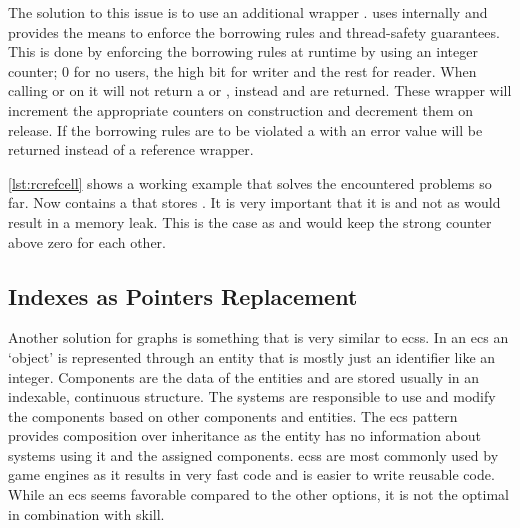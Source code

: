 \documentclass[thesis]{subfiles}
\begin{document}
    The solution to this issue is to use an additional wrapper .
     uses internally  and provides the means to enforce the borrowing rules and thread-safety guarantees.
    This is done by enforcing the borrowing rules at runtime by using an integer counter; 0 for no users, the high bit for writer and the rest for reader.
    When calling  or  on  it will not return a  or , instead  and  are returned.
    These wrapper will increment the appropriate counters on construction and decrement them on release.
    If the borrowing rules are to be violated a  with an error value will be returned instead of a reference wrapper.\autocite{rust-doc}

    

    \autoref{lst:rcrefcell} shows a working example that solves the encountered problems so far.
    Now \Node contains a  that stores \WeakT.
    It is very important that it is \WeakT and not \RcT as \RcT would result in a memory leak.
    This is the case as  and  would keep the strong counter above zero for each other.


  \subsection{Indexes as Pointers Replacement}
    Another solution for graphs is something that is very similar to \glspl{ecs}.
    In an \gls{ecs} an `object' is represented through an entity that is mostly just an identifier like an integer.
    Components are the data of the entities and are stored usually in an indexable, continuous structure.
    The systems are responsible to use and modify the components based on other components and entities.\autocite{sfml}
    The \gls{ecs} pattern provides composition over inheritance as the entity has no information about systems using it and the assigned components.
    \glspl{ecs} are most commonly used by game engines as it results in very fast code and is easier to write reusable code\autocite{unity}.
    While an \gls{ecs} seems favorable compared to the other options, it is not the optimal in combination with \gls{skill}.
\end{document}
